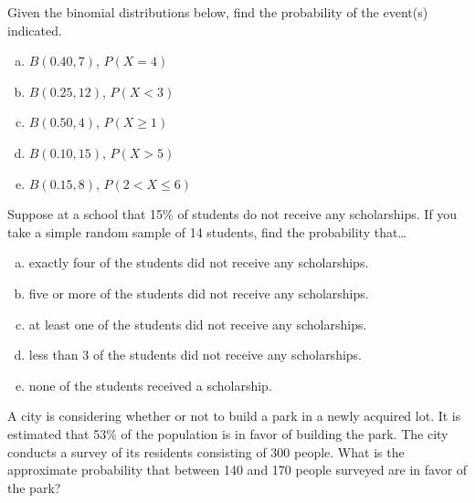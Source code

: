 \documentclass[11pt,letterpaper]{article}
\begin{document}

 Given the binomial distributions below, find the probability of the event(s) indicated. 
	\begin{enumerate}[(a)]
	\item $B(0.40, 7)$, $P(X= 4)$
	\item $B(0.25, 12)$, $P(X < 3)$
	\item $B(0.50, 4)$, $P(X \geq 1)$
	\item $B(0.10, 15)$, $P(X > 5)$
	\item $B(0.15, 8)$, $P(2 < X \leq 6)$
	\end{enumerate}


\newpage


 Suppose at a school that 15\% of students do not receive any scholarships. If you take a simple random sample of 14 students, find the probability that\dots
	\begin{enumerate}[(a)]
	\item exactly four of the students did not receive any scholarships. 
	\item five or more of the students did not receive any scholarships.
	\item at least one of the students did not receive any scholarships.
	\item less than 3 of the students did not receive any scholarships.
	\item none of the students received a scholarship. 
	\end{enumerate}



\newpage



 A city is considering whether or not to build a park in a newly acquired lot. It is estimated that 53\% of the population is in favor of building the park. The city conducts a survey of its residents consisting of 300 people. What is the approximate probability that between 140 and 170 people surveyed are in favor of the park?
\end{document}
